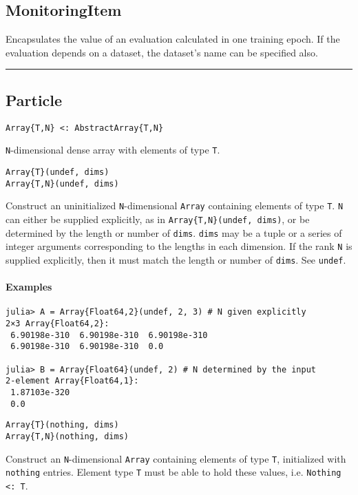 \subsection*{MonitoringItem}
Encapsulates the value of an evaluation calculated in one training epoch. If the evaluation depends on a dataset, the dataset's name can be specified also.

\noindent\rule{\textwidth}{1pt}
\subsection*{Particle}
\begin{verbatim}
Array{T,N} <: AbstractArray{T,N}
\end{verbatim}
\texttt{N}-dimensional dense array with elements of type \texttt{T}.

\begin{verbatim}
Array{T}(undef, dims)
Array{T,N}(undef, dims)
\end{verbatim}
Construct an uninitialized \texttt{N}-dimensional \texttt{Array} containing elements of type \texttt{T}. \texttt{N} can either be supplied explicitly, as in \texttt{Array\{T,N\}(undef, dims)}, or be determined by the length or number of \texttt{dims}. \texttt{dims} may be a tuple or a series of integer arguments corresponding to the lengths in each dimension. If the rank \texttt{N} is supplied explicitly, then it must match the length or number of \texttt{dims}. See \texttt{undef}.

\paragraph*{Examples}
\begin{verbatim}
julia> A = Array{Float64,2}(undef, 2, 3) # N given explicitly
2×3 Array{Float64,2}:
 6.90198e-310  6.90198e-310  6.90198e-310
 6.90198e-310  6.90198e-310  0.0

julia> B = Array{Float64}(undef, 2) # N determined by the input
2-element Array{Float64,1}:
 1.87103e-320
 0.0
\end{verbatim}
\begin{verbatim}
Array{T}(nothing, dims)
Array{T,N}(nothing, dims)
\end{verbatim}
Construct an \texttt{N}-dimensional \texttt{Array} containing elements of type \texttt{T}, initialized with \texttt{nothing} entries. Element type \texttt{T} must be able to hold these values, i.e. \texttt{Nothing <: T}.

